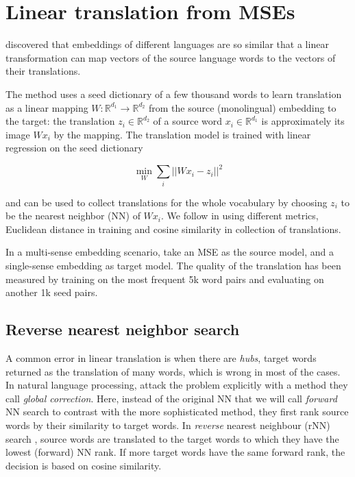\documentclass[11pt]{article}
\newcommand{\Ro}{\mathbb{R}^{d_1}}
\newcommand{\Rt}{\mathbb{R}^{d_2}}
\begin{document}
\section{Linear translation from MSEs}

 \cite{Mikolov:2013x} discovered that embeddings of different languages are so
 similar that a linear transformation can map vectors of the source language
 words to the vectors of their translations.

The method uses a seed dictionary of a few thousand words to learn translation
as a linear mapping $W: \mathbb{R}^{d_1}\rightarrow \mathbb{R}^{d_2}$ from the
source (monolingual) embedding to the target: the translation $z_i \in \Rt$ of
a source word $x_i \in \Ro$ is approximately its image $Wx_i$ by the mapping.
The translation model is trained with linear regression on the seed dictionary

\[\min_W \sum_i || Wx_i - z_i ||^2 \]

\noindent and can be used to collect translations for the whole vocabulary by
choosing $z_i$ to be the nearest neighbor (NN) of $Wx_i$.
We follow \cite{Mikolov:2013x} in using different metrics, Euclidean
 distance in training and cosine similarity in collection of translations.


In a multi-sense embedding scenario, \cite{Borbely:2016} take an MSE as the
source model, and a single-sense embedding as target model.  The quality of the
translation has been measured by training on the most frequent 5k word pairs
and evaluating on another 1k seed pairs.

\subsection{Reverse nearest neighbor search}



A common error in linear translation is when there are \emph{hubs}, target
words returned as the translation of many words, which is wrong in most of the
cases.  In natural language processing, \cite{Dinu:2015} attack the problem
explicitly with a method they call \emph{global correction}.  Here, instead of
the original NN that we will call \emph{forward} NN search to contrast with the
more sophisticated method, they first rank source words by their similarity to
target words. In \emph{reverse} nearest neighbour (rNN) search , source words are translated to the target
words to which they have the lowest (forward) NN rank.  If more target
words have the same forward rank, the decision is based on cosine similarity.
\end{document}
